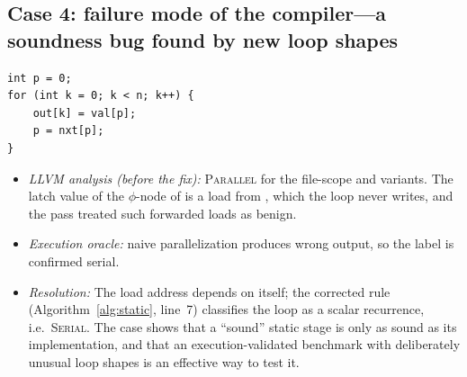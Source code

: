 \subsection{Case 4: failure mode of the compiler---a soundness bug found by new loop shapes}
\begin{lstlisting}[style=customc, caption={Gather along a linked list stored as a successor array (\Code{x\_list\_walk}, HF-LoopBench-X).}]
int p = 0;
for (int k = 0; k < n; k++) {
    out[k] = val[p];
    p = nxt[p];
}
\end{lstlisting}
\begin{itemize}
    \item \textit{LLVM analysis (before the fix):} \textsc{Parallel} for the file-scope and  variants. The latch value of the $\phi$-node of  is a load from , which the loop never writes, and the pass treated such forwarded loads as benign.
    \item \textit{Execution oracle:} naive parallelization produces wrong output, so the label is confirmed serial.
    \item \textit{Resolution:} The load address depends on  itself; the corrected rule (Algorithm~\ref{alg:static}, line~7) classifies the loop as a scalar recurrence, i.e.\ \textsc{Serial}. The case shows that a ``sound'' static stage is only as sound as its implementation, and that an execution-validated benchmark with deliberately unusual loop shapes is an effective way to test it.
\end{itemize}
